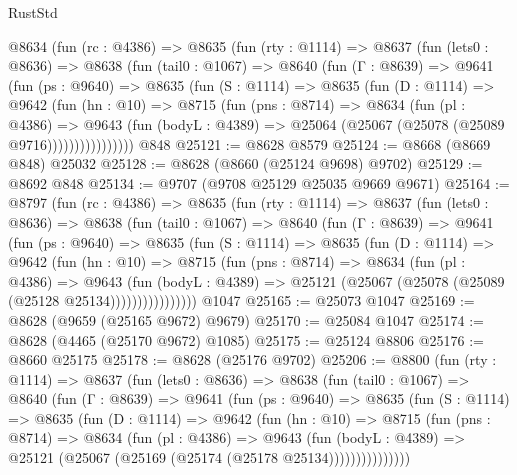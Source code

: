 \begin{lexlean}{RustStd}
\begin{coremodule}
    @8634
      (fun (rc : @4386) =>
      @8635
        (fun (rty : @1114) =>
        @8637
          (fun (lets0 : @8636) =>
          @8638
            (fun (tail0 : @1067) =>
            @8640
              (fun (Γ : @8639) =>
              @9641
                (fun (ps : @9640) =>
                @8635
                  (fun (S : @1114) =>
                  @8635
                    (fun (D : @1114) =>
                    @9642
                      (fun (hn : @10) =>
                      @8715
                        (fun (pns : @8714) =>
                        @8634
                          (fun (pl : @4386) =>
                          @9643
                            (fun (bodyL : @4389) =>
                            @25064 (@25067 (@25078 (@25089 @9716))))))))))))))))
    @848
@25121 := @8628 @8579
@25124 := @8668 (@8669 @848) @25032
@25128 := @8628 (@8660 (@25124 @9698) @9702)
@25129 := @8692 @848
@25134 := @9707 (@9708 @25129 @25035 @9669 @9671)
@25164 := @8797
    (fun (rc : @4386) =>
    @8635
      (fun (rty : @1114) =>
      @8637
        (fun (lets0 : @8636) =>
        @8638
          (fun (tail0 : @1067) =>
          @8640
            (fun (Γ : @8639) =>
            @9641
              (fun (ps : @9640) =>
              @8635
                (fun (S : @1114) =>
                @8635
                  (fun (D : @1114) =>
                  @9642
                    (fun (hn : @10) =>
                    @8715
                      (fun (pns : @8714) =>
                      @8634
                        (fun (pl : @4386) =>
                        @9643
                          (fun (bodyL : @4389) =>
                          @25121 (@25067 (@25078 (@25089 (@25128 @25134))))))))))))))))
    @1047
@25165 := @25073 @1047
@25169 := @8628 (@9659 (@25165 @9672) @9679)
@25170 := @25084 @1047
@25174 := @8628 (@4465 (@25170 @9672) @1085)
@25175 := @25124 @8806
@25176 := @8660 @25175
@25178 := @8628 (@25176 @9702)
@25206 := @8800
    (fun (rty : @1114) =>
    @8637
      (fun (lets0 : @8636) =>
      @8638
        (fun (tail0 : @1067) =>
        @8640
          (fun (Γ : @8639) =>
          @9641
            (fun (ps : @9640) =>
            @8635
              (fun (S : @1114) =>
              @8635
                (fun (D : @1114) =>
                @9642
                  (fun (hn : @10) =>
                  @8715
                    (fun (pns : @8714) =>
                    @8634
                      (fun (pl : @4386) =>
                      @9643
                        (fun (bodyL : @4389) =>
                        @25121 (@25067 (@25169 (@25174 (@25178 @25134)))))))))))))))

\end{coremodule}
\end{lexlean}
